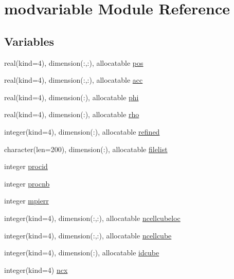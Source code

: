 \hypertarget{namespacemodvariable}{}\section{modvariable Module Reference}
\label{namespacemodvariable}
\subsection*{Variables}
\begin{DoxyCompactItemize}
\item 
real(kind=4), dimension(\+:,\+:), allocatable \hyperlink{namespacemodvariable_a280e598b1db785bf34f0165ecd7b6985}{pos}
\item 
real(kind=4), dimension(\+:,\+:), allocatable \hyperlink{namespacemodvariable_a3d403cfbb8c3f6373447b1e6647d7aa7}{acc}
\item 
real(kind=4), dimension(\+:), allocatable \hyperlink{namespacemodvariable_a00db7c06432451702db34fda71ed1cd1}{phi}
\item 
real(kind=4), dimension(\+:), allocatable \hyperlink{namespacemodvariable_a29eaedbfcc5873ff326af3c93e5558c6}{rho}
\item 
integer(kind=4), dimension(\+:), allocatable \hyperlink{namespacemodvariable_a8de6519433943eabe03c631fdab15e67}{refined}
\item 
character(len=200), dimension(\+:), allocatable \hyperlink{namespacemodvariable_a73053f430f8e14a8f6c91851e02ca4c0}{filelist}
\item 
integer \hyperlink{namespacemodvariable_af640fc287249ccc7e43133f74d704cf5}{procid}
\item 
integer \hyperlink{namespacemodvariable_a77ab6ce14a18f48d9c5f3ccd1f1cf044}{procnb}
\item 
integer \hyperlink{namespacemodvariable_a85886f33027f4edc9331bd9ada689d22}{mpierr}
\item 
integer(kind=4), dimension(\+:,\+:), allocatable \hyperlink{namespacemodvariable_ac90972e5c9f0aa13073f9f1f6f9cf879}{ncellcubeloc}
\item 
integer(kind=4), dimension(\+:,\+:), allocatable \hyperlink{namespacemodvariable_a8bc6342027666b4dec0f7f417c754b55}{ncellcube}
\item 
integer(kind=4), dimension(\+:), allocatable \hyperlink{namespacemodvariable_a3d2c992bfc80529f8019708135b526c1}{idcube}
\item 
integer(kind=4) \hyperlink{namespacemodvariable_af74891a7a77b7407b68129d1e9778f21}{ncx}
\item 

\end{DoxyCompactItemize}
